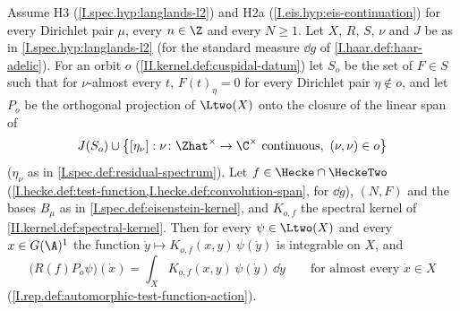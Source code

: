 Assume H3 (\cref{I.spec.hyp:langlands-l2}) and H2a (\cref{I.eis.hyp:eis-continuation}) for every Dirichlet pair $\mu$, every $n\in\Z$ and every $N\ge1$. Let
$X$, $R$, $S$, $\nu$ and $J$ be as in \cref{I.spec.hyp:langlands-l2} (for the standard measure $\dd g$ of \cref{I.haar.def:haar-adelic}). For an orbit $o$
(\cref{II.kernel.def:cuspidal-datum}) let $S_o$ be the set of $F\in S$ such that for $\nu$-almost every $t$, $F(t)_\eta=0$ for every Dirichlet pair
$\eta\notin o$, and let $P_o$ be the orthogonal projection of $\Ltwo(X)$ onto the closure of the linear span of
\[
  J(S_o)\cup\bigl\{[\eta_\nu]:\nu\colon\Zhat^\times\to\C^\times\text{ continuous},\ (\nu,\nu)\in o\bigr\}
\]
($\eta_\nu$ as in \cref{I.spec.def:residual-spectrum}). Let $f\in\Hecke\cap\HeckeTwo$ (\cref{I.hecke.def:test-function,I.hecke.def:convolution-span}, for $\dd g$),
$(N,F)$ and the bases $B_\mu$ as in \cref{I.spec.def:eisenstein-kernel}, and $K_{o,f}$ the spectral kernel of \cref{II.kernel.def:spectral-kernel}. Then for every
$\psi\in\Ltwo(X)$ and every $x\in G(\A)^1$ the function $\dot y\mapsto K_{o,f}(x,y)\,\psi(\dot y)$ is integrable on $X$, and
\[
  \bigl(R(f)P_o\psi\bigr)(\dot x)=\int_XK_{o,f}(x,y)\,\psi(\dot y)\,\dd\dot y\qquad\text{for almost every }\dot x\in X
\]
(\cref{I.rep.def:automorphic-test-function-action}).

